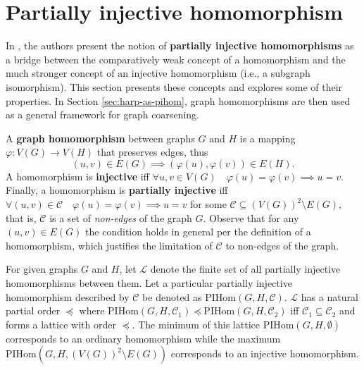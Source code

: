 \section{Partially injective homomorphism}

In \cite{schulz_mining_2019}, the authors present the notion of \textbf{partially injective homomorphisms} as a bridge between the comparatively weak concept of a homomorphism and the much stronger concept of an injective homomorphism (i.e., a subgraph isomorphism). This section presents these concepts and explores some of their properties. In Section \ref{sec:harp-as-pihom}, graph homomorphisms are then used as a general framework for graph coarsening.

A \textbf{graph homomorphism} between graphs \( G \) and \( H \) is a mapping \( \varphi: V \left( G \right) \to V \left( H \right) \) that preserves edges, thus
\[ \left( u, v \right) \in E \left( G \right) \implies \left( \varphi \left( u \right), \varphi \left( v \right) \right) \in E \left( H \right) \text{.} \]
A homomorphism is \textbf{injective} iff \( \forall u, v \in V \left( G \right) \quad \varphi \left( u \right) = \varphi \left( v \right) \implies u = v \text{.} \)
Finally, a homomorphism is \textbf{partially injective} iff
\( \forall \left( u, v \right) \in \mathcal{C} \quad \varphi \left( u \right) = \varphi \left( v \right) \implies u = v \)
for some \( \mathcal{C} \subseteq \left( V \left( G \right) \right)^2 \setminus E \left( G \right) \), that is, \( \mathcal{C} \) is a set of \textit{non-edges} of the graph \( G \).
Observe that for any \( \left( u, v \right) \in E \left( G \right) \) the condition holds in general per the definition of a homomorphism, which justifies the limitation of \( \mathcal{C} \) to non-edges of the graph.

For given graphs \( G \) and \( H \), let \( \mathcal{L} \) denote the finite set of all partially injective homomorphisms between them. Let a particular partially injective homomorphism described by \( \mathcal{C} \) be denoted as \( \mathrm{PIHom} \left( G, H, \mathcal{C} \right) \). \( \mathcal{L} \) has a natural partial order \( \preceq \) where \( \mathrm{PIHom} \left( G, H, \mathcal{C}_1 \right) \preceq \mathrm{PIHom} \left( G, H, \mathcal{C}_2 \right) \) iff \( \mathcal{C}_1 \subseteq \mathcal{C}_2 \) and forms a lattice with order \( \preceq \). The minimum of this lattice \( \mathrm{PIHom} \left( G, H, \emptyset \right) \) corresponds to an ordinary homomorphism while the maximum \(\mathrm{PIHom} \left( G, H, \left( V \left( G \right) \right)^2 \setminus E \left( G \right) \right) \) corresponds to an injective homomorphism.
